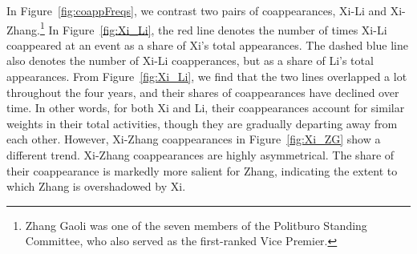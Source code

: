 \documentclass[11pt,english]{article}
\begin{document}
\begin{flushleft}
In Figure~\ref{fig:coappFreqs}, we contrast two pairs of coappearances, Xi-Li and Xi-Zhang.\footnote{Zhang Gaoli was one of the seven members of the Politburo Standing Committee, who also served as the first-ranked Vice Premier.} In Figure~\ref{fig:Xi_Li},  the red line denotes the number of times Xi-Li coappeared at an event as a share of  Xi's total appearances. The dashed blue line also denotes the number of Xi-Li coapperances, but as a share of Li's total appearances. From Figure~\ref{fig:Xi_Li}, we find that the two lines overlapped a lot throughout the four years, and their shares of coappearances have declined over time. In other words, for both Xi and Li, their coappearances account for similar weights in their total activities, though they are gradually departing away from each other. However, Xi-Zhang coappearances in Figure~\ref{fig:Xi_ZG} show a different trend. Xi-Zhang coappearances are highly asymmetrical. The share of their coappearance is markedly more salient for Zhang, indicating the extent to which Zhang is overshadowed by Xi.


\end{flushleft}
\end{document}
